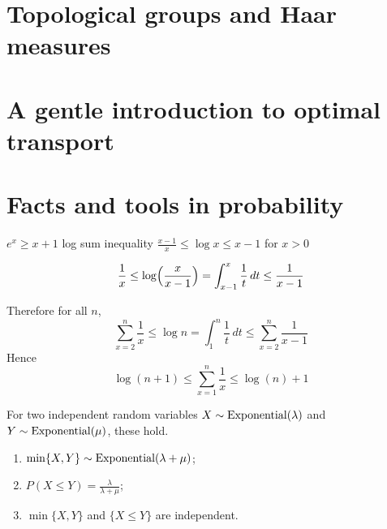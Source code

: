 \section{Topological groups and Haar measures}

\section{A gentle introduction to optimal transport}

\section{Facts and tools in probability}
$e^x \geq x + 1$ log sum inequality
$\frac{x-1}{x}\leq \log x \leq x - 1$ for $x > 0$

\[\frac{1}{x}\leq \log\Bigl(\frac{x}{x-1}\Bigr) = \int_{x-1}^x \frac{1}{t}\,dt\leq \frac{1}{x-1}\]

Therefore for all $n$, \[
    \sum_{x=2}^n \frac{1}{x} \leq \log n = \int_1^n \frac{1}{t}\,dt \leq \sum_{x=2}^n \frac{1}{x-1}
\]
Hence \[
    \log(n+1) \leq \sum_{x=1}^n\frac{1}{x}\leq \log(n) +1
\]

\begin{prop}
    For two independent random variables $X\sim \operatorname{Exponential}(\lambda)$ and $Y\sim \operatorname{Exponential}(\mu)$, these hold. \begin{enumerate}
        \item $\min\{X,Y\} \sim \operatorname{Exponential}(\lambda + \mu)$;
        \item $P(X \leq Y) = \frac{\lambda}{\lambda + \mu}$;
        \item $\min\{X,Y\}$ and $\{X\leq Y\}$ are independent.
    \end{enumerate}
\end{prop}

